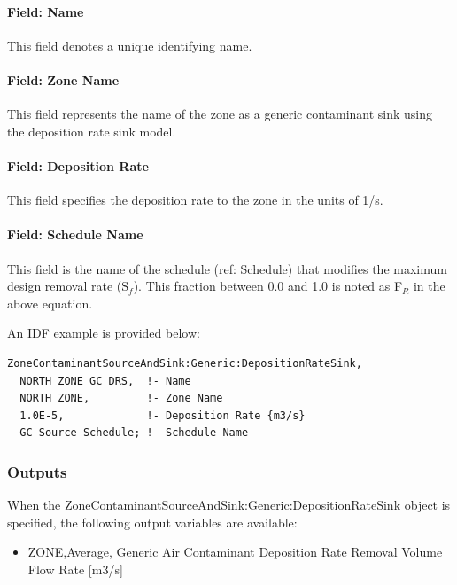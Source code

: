 \paragraph{Field: Name}\label{field-name-17-003}

This field denotes a unique identifying name.

\paragraph{Field: Zone Name}\label{field-zone-name-6-002}

This field represents the name of the zone as a generic contaminant sink using the deposition rate sink model.

\paragraph{Field: Deposition Rate}\label{field-deposition-rate}

This field specifies the deposition rate to the zone in the units of 1/s.

\paragraph{Field: Schedule Name}\label{field-schedule-name-10}

This field is the name of the schedule (ref: Schedule) that modifies the maximum design removal rate (S\(_{f}\)). This fraction between 0.0 and 1.0 is noted as F\(_{R}\) in the above equation.

An IDF example is provided below:

\begin{lstlisting}
ZoneContaminantSourceAndSink:Generic:DepositionRateSink,
  NORTH ZONE GC DRS,  !- Name
  NORTH ZONE,         !- Zone Name
  1.0E-5,             !- Deposition Rate {m3/s}
  GC Source Schedule; !- Schedule Name
\end{lstlisting}

\subsubsection{Outputs}\label{outputs-13-002}

When the ZoneContaminantSourceAndSink:Generic:DepositionRateSink object is specified, the following output variables are available:

\begin{itemize}
    \tightlist
  \item
    ZONE,Average, Generic Air Contaminant Deposition Rate Removal Volume Flow Rate {[}m3/s{]}
\end{itemize}

